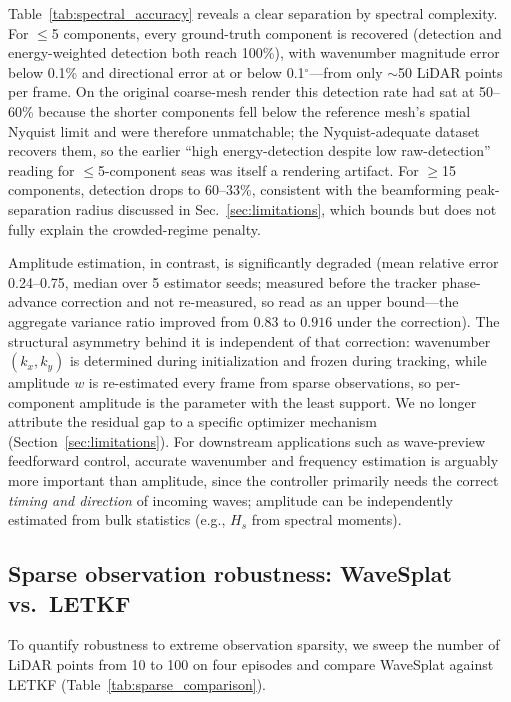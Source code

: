 Table~\ref{tab:spectral_accuracy} reveals a clear separation by
spectral complexity.
For $\leq$5 components, every ground-truth component is recovered
(detection and energy-weighted detection both reach 100\%), with
wavenumber magnitude error below 0.1\% and directional error at or
below 0.1$^\circ$---from only $\sim$50 LiDAR points per frame.  On the
original coarse-mesh render this detection rate had sat at 50--60\%
because the shorter components fell below the reference mesh's spatial
Nyquist limit and were therefore unmatchable; the Nyquist-adequate
dataset recovers them, so the earlier ``high energy-detection despite
low raw-detection'' reading for $\leq$5-component seas was itself a
rendering artifact.
For $\geq$15 components, detection drops to 60--33\%, consistent with
the beamforming peak-separation radius discussed in
Sec.~\ref{sec:limitations}, which bounds but does not fully explain the
crowded-regime penalty.

Amplitude estimation, in contrast, is significantly degraded (mean
relative error 0.24--0.75, median over 5 estimator seeds; measured before
the tracker phase-advance correction and not re-measured, so read as an
upper bound---the aggregate variance ratio improved from $0.83$ to
$0.916$ under the correction).  The structural asymmetry behind it is
independent of that correction: wavenumber $(k_x, k_y)$ is determined
during initialization and frozen during tracking, while amplitude $w$ is
re-estimated every frame from sparse observations, so per-component
amplitude is the parameter with the least support.  We no longer
attribute the residual gap to a specific optimizer mechanism
(Section~\ref{sec:limitations}).  For downstream applications
such as wave-preview feedforward control, accurate wavenumber and
frequency estimation is arguably more important than amplitude, since
the controller primarily needs the correct \emph{timing and direction}
of incoming waves; amplitude can be independently estimated from
bulk statistics (e.g., $H_s$ from spectral moments).

\subsection{Sparse observation robustness: WaveSplat vs.\ LETKF}
\label{sec:sparse_comparison}

To quantify robustness to extreme observation sparsity, we sweep the
number of LiDAR points from 10 to 100 on four episodes and compare
WaveSplat against LETKF (Table~\ref{tab:sparse_comparison}).

